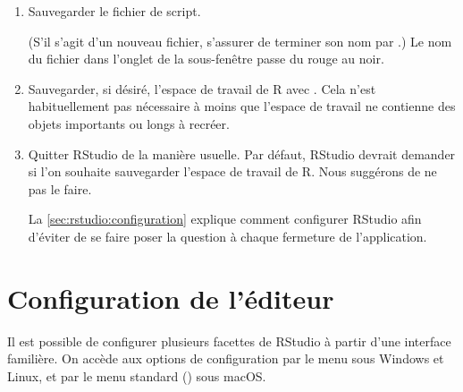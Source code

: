 \begin{enumerate}
\begin{trivlist}
  \end{trivlist}
\item Sauvegarder le fichier de script.
  (S'il s'agit d'un nouveau fichier, s'assurer de terminer son nom par
  .) Le nom du fichier dans l'onglet de la sous-fenêtre passe
  du rouge au noir.
\item Sauvegarder, si désiré, l'espace de travail de R avec
  . Cela n'est
  habituellement pas nécessaire à moins que l'espace de travail ne
  contienne des objets importants ou longs à recréer.
\item Quitter RStudio de la manière usuelle. Par défaut, RStudio
  devrait demander si l'on souhaite sauvegarder l'espace de travail de
  R. Nous suggérons de ne pas le faire.

  La \autoref{sec:rstudio:configuration} explique comment configurer
  RStudio afin d'éviter de se faire poser la question à chaque
  fermeture de l'application.
\end{enumerate}


\section{Configuration de l'éditeur}
\label{sec:rstudio:configuration}

Il est possible de configurer plusieurs facettes de RStudio à partir
d'une interface familière. On accède aux options de configuration par
le menu  sous Windows et Linux, et par le
menu standard  (\code{\cmdkey\,,})
sous macOS.

